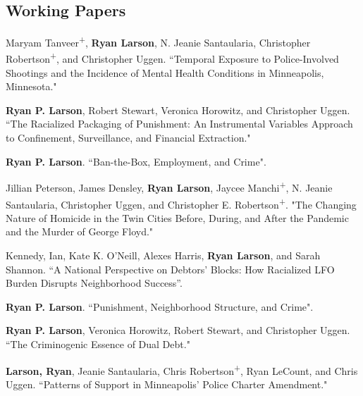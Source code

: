 \documentclass[letterpaper]{article}
\newenvironment{publist}{%
  \begin{list}{}{%
    \setlength{\leftmargin}{0cm}   %
    \setlength{\labelwidth}{2cm}     %
    \setlength{\labelsep}{0.5cm}     %
  }%
}{%
  \end{list}%
}
\begin{document}
\subsection*{Working Papers}
\begin{publist}

\item Maryam Tanveer\textsuperscript{+}, \textbf{Ryan Larson}, N. Jeanie Santaularia, Christopher Robertson\textsuperscript{+}, and Christopher Uggen. ``Temporal Exposure to Police-Involved Shootings and the Incidence of Mental Health Conditions in Minneapolis, Minnesota."

\item \textbf{Ryan P. Larson}, Robert Stewart, Veronica Horowitz, and Christopher Uggen. ``The Racialized Packaging of Punishment: An Instrumental Variables Approach to Confinement, Surveillance, and Financial Extraction."

\item \textbf{Ryan P. Larson}. ``Ban-the-Box, Employment, and Crime". 

\item Jillian Peterson, James Densley, \textbf{Ryan Larson}, Jaycee Manchi\textsuperscript{+}, N. Jeanie Santaularia, Christopher Uggen, and Christopher E. Robertson\textsuperscript{+}. "The Changing Nature of Homicide in the Twin Cities Before, During, and After the Pandemic and the Murder of George Floyd."

\item Kennedy, Ian, Kate K. O’Neill, Alexes Harris, \textbf{Ryan Larson}, and Sarah Shannon. “A National Perspective on Debtors’ Blocks: How Racialized LFO Burden Disrupts Neighborhood Success”.

\item \textbf{Ryan P. Larson}. ``Punishment, Neighborhood Structure, and Crime".


\item \textbf{Ryan P. Larson}, Veronica Horowitz, Robert Stewart, and Christopher Uggen. ``The Criminogenic Essence of Dual Debt."

\item \textbf{Larson, Ryan}, Jeanie Santaularia, Chris Robertson\textsuperscript{+}, Ryan LeCount, and Chris Uggen.  ``Patterns of Support in Minneapolis’ Police Charter Amendment." 


\end{publist}
\end{document}
